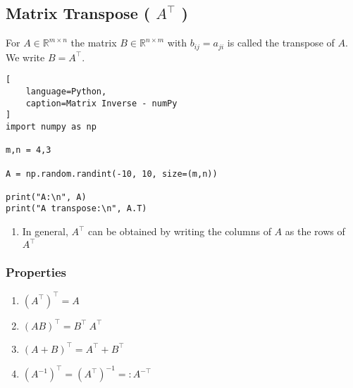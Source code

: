 \subsection{Matrix Transpose ( $A^{\top}$ ) \cite{mfml/book/mml/Deisenroth-Faisal-Ong}}

For $A \in \mathbb{R}^{m\times n}$ the matrix $B \in \mathbb{R}^{n\times m}$ with $b_{ij} = a_{ji}$ is called the transpose of $A$. We write $B = A^\top$.
\hfill \cite{mfml/book/mml/Deisenroth-Faisal-Ong}






\begin{lstlisting}[
    language=Python,
    caption=Matrix Inverse - numPy
]
import numpy as np

m,n = 4,3

A = np.random.randint(-10, 10, size=(m,n))

print("A:\n", A)
print("A transpose:\n", A.T)
\end{lstlisting}







\begin{enumerate}
    \item In general, $A^\top$ can be obtained by writing the columns of $A$ as the rows of $A^\top$
    \hfill \cite{mfml/book/mml/Deisenroth-Faisal-Ong}

\end{enumerate}



\subsubsection{Properties}

\begin{multicols}{2}
\begin{enumerate}
    \item $(A^\top)^\top = A$
    \hfill \cite{mfml/book/mml/Deisenroth-Faisal-Ong}

    \item $(AB)^\top = B^\top\ A^\top$
    \hfill \cite{mfml/book/mml/Deisenroth-Faisal-Ong}

    \item $(A+B)^\top = A^\top + B^\top$
    \hfill \cite{mfml/book/mml/Deisenroth-Faisal-Ong}

    \item $(A^{-1})^\top = (A^\top)^{-1} =: A^{-\top}$
    \hfill \cite{mfml/book/mml/Deisenroth-Faisal-Ong}

\end{enumerate}
\end{multicols}







